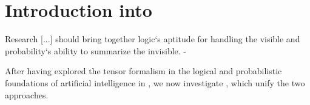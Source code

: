 \chapter{Introduction into }

\begin{highlight}
	Research [...] should bring together logic`s aptitude for handling the visible and probability`s ability to summarize the invisible. - 
\end{highlight}

After having explored the tensor formalism in the logical and probabilistic foundations of artificial intelligence in , we now investigate \HybridLogicNetworks{}, which unify the two approaches.



